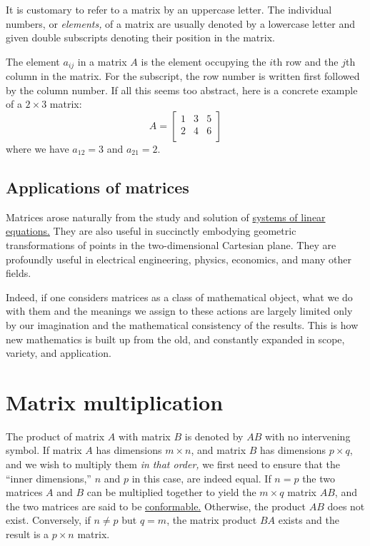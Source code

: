 \documentclass[
  a4paper,
]{article}
\begin{document}
It is customary to refer to a matrix by an uppercase letter. The
individual numbers, or \emph{elements,} of a matrix are usually denoted
by a lowercase letter and given double subscripts denoting their
position in the matrix.

The element \(a_{ij}\) in a matrix \(A\) is the element occupying the
\(i\)th row and the \(j\)th column in the matrix. For the subscript, the
row number is written first followed by the column number. If all this
seems too abstract, here is a concrete example of a \(2 \times 3\)
matrix: \[
A = \left[
\begin{matrix}
1 & 3 & 5\\
2 & 4 & 6\\
\end{matrix}
\right]
\] where we have \(a_{12} = 3\) and \(a_{21} = 2.\)

\hypertarget{applications-of-matrices}{%
\subsection{Applications of matrices}\label{applications-of-matrices}}

Matrices arose naturally from the study and solution of
\href{ttps://mathworld.wolfram.com/LinearSystemofEquations.html}{systems
of linear equations.} They are also useful in succinctly embodying
geometric transformations of points in the two-dimensional Cartesian
plane. They are profoundly useful in electrical engineering, physics,
economics, and many other fields.

Indeed, if one considers matrices as a class of mathematical object,
what we do with them and the meanings we assign to these actions are
largely limited only by our imagination and the mathematical consistency
of the results. This is how new mathematics is built up from the old,
and constantly expanded in scope, variety, and application.

\hypertarget{matrix-multiplication}{%
\section{Matrix multiplication}\label{matrix-multiplication}}

The product of matrix \(A\) with matrix \(B\) is denoted by \(AB\) with
no intervening symbol. If matrix \(A\) has dimensions \(m \times n\),
and matrix \(B\) has dimensions \(p \times q\), and we wish to multiply
them \emph{in that order,} we first need to ensure that the ``inner
dimensions,'' \(n\) and \(p\) in this case, are indeed equal. If
\(n = p\) the two matrices \(A\) and \(B\) can be multiplied together to
yield the \(m \times q\) matrix \(AB\), and the two matrices are said to
be \href{https://en.wikipedia.org/wiki/Conformable_matrix}{conformable.}
Otherwise, the product \(AB\) does not exist. Conversely, if
\(n \neq p\) but \(q = m\), the matrix product \(BA\) exists and the
result is a \(p \times n\) matrix.
\end{document}

